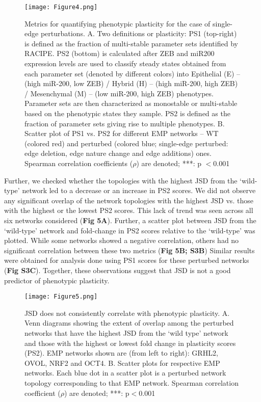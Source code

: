 \documentclass[preprint,review,12pt]{elsarticle}
\begin{document}
	
	\begin{figure}[!ht]
		\centering
		\texttt{[image: Figure4.png]}
		\caption{
			Metrics for quantifying phenotypic plasticity for the case of single-edge perturbations.
			A.	Two definitions or plasticity: PS1 (top-right) is defined as the fraction of multi-stable parameter sets identified by RACIPE. PS2 (bottom) is calculated after ZEB and miR200 expression levels are used to classify\color{red} steady states obtained from each parameter set (denoted by different colors) into Epithelial (E) – (high miR-200, low ZEB) / Hybrid (H) – (high miR-200, high ZEB) / Mesenchymal (M) – (low miR-200, high ZEB) phenotypes. Parameter sets are then characterized as monostable or multi-stable based on the phenotypic states they sample. PS2 is defined as the fraction of parameter sets giving rise to multiple phenotypes. \color{black}
			B.	Scatter plot of PS1 vs. PS2 for different EMP networks – WT (colored red) and perturbed (colored blue; single-edge perturbed: edge deletion, edge nature change and edge additions) ones. Spearman correlation coefficients ($\rho$) are denoted; ***: p $<$0.001
		}
		\label{figure4}
	\end{figure}


	Further, we checked whether the topologies with the highest JSD from the ‘wild-type’ network led to a decrease or an increase in PS2 scores. We did not observe any significant overlap of the network topologies with the highest JSD vs. those with the highest or the lowest PS2 scores. This lack of trend was seen across all six networks considered (\textbf{Fig 5A}). Further, a scatter plot between JSD from the ‘wild-type’ network and fold-change in PS2 scores relative to the ‘wild-type’ was plotted. While some networks showed a negative correlation, others had no significant correlation between these two metrics (\textbf{Fig 5B; S3B}) Similar results were obtained for analysis done using PS1 scores for these perturbed networks (\textbf{Fig S3C}). Together, these observations suggest that JSD is not a good predictor of phenotypic plasticity.
	
	\begin{figure}[!ht]
		\centering
		\texttt{[image: Figure5.png]}
		\caption{JSD does not consistently correlate with phenotypic plasticity. A. Venn diagrams showing the extent of overlap among the perturbed networks that have the highest JSD from the ‘wild type’ network  and those with the highest or lowest fold change in plasticity scores (PS2). EMP networks shown are (from left to right): GRHL2, OVOL, NRF2 and OCT4.  B. Scatter plots for respective EMP networks. Each blue dot in a scatter plot is a perturbed network topology corresponding to that EMP network. Spearman correlation coefficient ($\rho$) are denoted; ***: p$<$0.001}
		\label{figure5}
	\end{figure}
	
\end{document}
